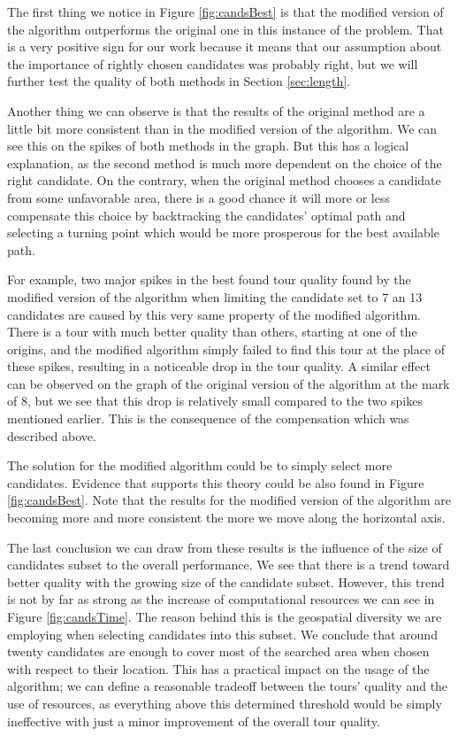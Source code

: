 \documentclass{ctuthesis}
\begin{document}
The first thing we notice in Figure \ref{fig:candsBest} is that the modified version of the algorithm outperforms the original one in this instance of the problem. That is a very positive sign for our work because it means that our assumption about the importance of rightly chosen candidates was probably right, but we will further test the quality of both methods in Section \ref{sec:length}. \par 

Another thing we can observe is that the results of the original method are a little bit more consistent than in the modified version of the algorithm. We can see this on the spikes of both methods in the graph. But this has a logical explanation, as the second method is much more dependent on the choice of the right candidate. On the contrary, when the original method chooses a candidate from some unfavorable area, there is a good chance it will more or less compensate this choice by backtracking the candidates’ optimal path and selecting a turning point which would be more prosperous for the best available path. \par For example, two major spikes in the best found tour quality found by the modified version of the algorithm when limiting the candidate set to 7 an 13 candidates are caused by this very same property of the modified algorithm. There is a tour with much better quality than others, starting at one of the origins, and the modified algorithm simply failed to find this tour at the place of these spikes, resulting in a noticeable drop in the tour quality. A similar effect can be observed on the graph of the original version of the algorithm at the mark of 8, but we see that this drop is relatively small compared to the two spikes mentioned earlier. This is the consequence of the compensation which was described above.\par The solution for the modified algorithm could be to simply select more candidates. Evidence that supports this theory could be also found in Figure \ref{fig:candsBest}. Note that the results for the modified version of the algorithm are becoming more and more consistent the more we move along the horizontal axis.\par The last conclusion we can draw from these results is the influence of the size of candidates subset to the overall performance. We see that there is a trend toward better quality with the growing size of the candidate subset. However, this trend is not by far as strong as the increase of computational resources we can see in Figure \ref{fig:candsTime}. The reason behind this is the geospatial diversity we are employing when selecting candidates into this subset. We conclude that around twenty candidates are enough to cover most of the searched area when chosen with respect to their location. This has a practical impact on the usage of the algorithm; we can define a reasonable tradeoff between the tours’ quality and the use of resources, as everything above this determined threshold would be simply ineffective with just a minor improvement of the overall tour quality.
\end{document}
